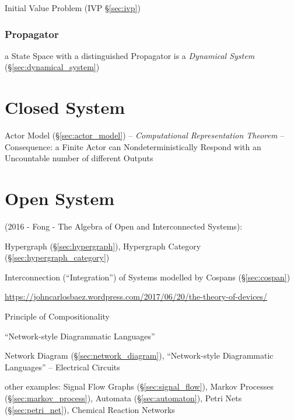 \fist Initial Value Problem (IVP \S\ref{sec:ivp})



\subsubsection{Propagator}\label{sec:propagator}

a State Space with a distinguished Propagator is a \emph{Dynamical System}
(\S\ref{sec:dynamical_system})



\section{Closed System}\label{sec:closed_system}


Actor Model (\S\ref{sec:actor_model}) -- \emph{Computational
  Representation Theorem} -- Consequence: a Finite Actor can
Nondeterministically Respond with an Uncountable number of different
Outputs %



\section{Open System}\label{sec:open_system}

(2016 - Fong - The Algebra of Open and Interconnected Systems):

\fist Hypergraph (\S\ref{sec:hypergraph}), Hypergraph Category
(\S\ref{sec:hypergraph_category})

Interconnection (``Integration'') of Systems modelled by Cospans
(\S\ref{sec:cospan})

\url{https://johncarlosbaez.wordpress.com/2017/06/20/the-theory-of-devices/}

Principle of Compositionality

``Network-style Diagrammatic Languages''

Network Diagram (\S\ref{sec:network_diagram}), ``Network-style
Diagrammatic Languages'' -- Electrical Circuits

other examples: Signal Flow Graphs (\S\ref{sec:signal_flow}),
Markov Processes (\S\ref{sec:markov_process}), Automata
(\S\ref{sec:automaton}), Petri Nets (\S\ref{sec:petri_net}), Chemical
Reaction Networks


